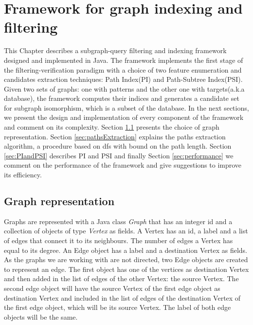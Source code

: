 \documentclass{l4proj}
\begin{document}


\chapter{Framework for graph indexing and filtering}
This Chapter describes a subgraph-query filtering and indexing framework designed and implemented in Java. The framework implements the first stage of the filtering-verification paradigm with a choice of two feature enumeration and candidates extraction techniques: Path Index(PI) and Path-Subtree Index(PSI). Given two sets of graphs: one with patterns and the other one with targets(a.k.a database), the framework computes their indices and generates a candidate set for subgraph isomorphism, which is a subset of the database. In the next sections, we present the design and implementation of every component of the framework and comment on its complexity. Section \ref{sec:graph-representation} presents the choice of graph representation. Section \ref{sec:pathsExtraction} explains the paths extraction algorithm, a procedure based on \gls{dfs} with bound on the path length. Section \ref{sec:PIandPSI} describes PI and PSI and finally Section \ref{sec:performance} we comment on the performance of the framework and give suggestions to improve its efficiency.

\section{Graph representation}
\label{sec:graph-representation}
Graphs are  represented with a Java class \emph{Graph} that has an integer id and a collection of objects of type \emph{Vertex} as fields. A Vertex has an id, a label and a list of edges that connect it to its neighbours. The number of edges a Vertex has equal to its degree. An Edge object has a label and a destination Vertex as fields. As the graphs we are working with are not directed, two Edge objects are created to represent an edge. The first object has one of the vertices as destination Vertex and then added in the list of edges of the other Vertex: the source Vertex. The second edge object will have the source Vertex of the first edge object as destination Vertex and included in the list of edges of the destination Vertex of the first edge object, which will be its source Vertex. The label of both edge objects will be the same.
\end{document}

